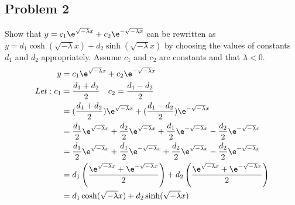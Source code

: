\documentclass{math}
\begin{document}
\subsection*{Problem 2}
Show that \( y = c_1\e^{\sqrt{-\lambda}x}+c_2\e^{-\sqrt{-\lambda x}} \) can be
rewritten as \( y = d_1\cosh(\sqrt{-\lambda}x)+d_2\sinh(\sqrt{-\lambda}x) \) by
choosing the values of constants \( d_1 \) and \( d_2 \) appropriately. Assume
\( c_1 \) and \( c_2 \) are constants and that \( \lambda < 0 \).
\begin{align*}
  y &= c_1\e^{\sqrt{-\lambda}x}+c_2\e^{-\sqrt{-\lambda}x} \\
  Let: c_1 &= \frac{d_1+d_2}{2} \quad c_2 = \frac{d_1-d_2}{2} \\
  &= (\frac{d_1+d_2}{2})\e^{\sqrt{-\lambda}x}+
    (\frac{d_1-d_2}{2})\e^{-\sqrt{-\lambda}x} \\
  &= \frac{d_1}{2}\e^{\sqrt{-\lambda}x}+\frac{d_2}{2}\e^{\sqrt{-\lambda}x}+
    \frac{d_1}{2}\e^{-\sqrt{-\lambda}x}-\frac{d_2}{2}\e^{-\sqrt{-\lambda}x} \\
  &= \frac{d_1}{2}\e^{\sqrt{-\lambda}x}+ \frac{d_1}{2}\e^{-\sqrt{-\lambda}x}+
    \frac{d_2}{2}\e^{\sqrt{-\lambda}x}-\frac{d_2}{2}\e^{-\sqrt{-\lambda}x} \\
  &= d_1\left(\frac{\e^{\sqrt{-\lambda}x}+\e^{-\sqrt{-\lambda}x}}{2}\right)+
    d_2\left(\frac{\e^{\sqrt{-\lambda}x}+\e^{-\sqrt{-\lambda}x}}{2}\right) \\
  &= d_1\cosh(\sqrt{-\lambda}x)+d_2\sinh(\sqrt{-\lambda}x)
\end{align*}
\end{document}
